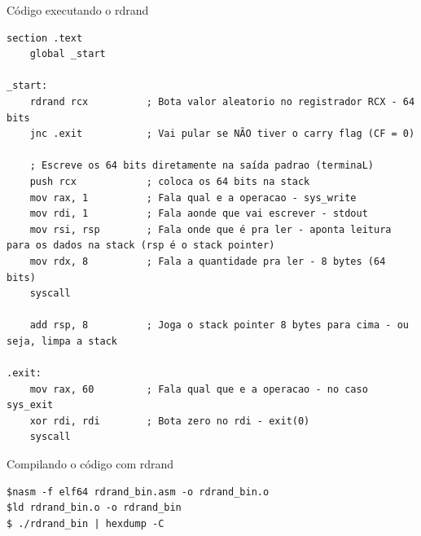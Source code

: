\begin{frame}[fragile]{Código executando o rdrand}
\tiny
    \begin{verbatim}
section .text
    global _start

_start:
    rdrand rcx          ; Bota valor aleatorio no registrador RCX - 64 bits
    jnc .exit           ; Vai pular se NÃO tiver o carry flag (CF = 0)

    ; Escreve os 64 bits diretamente na saída padrao (terminaL)
    push rcx            ; coloca os 64 bits na stack
    mov rax, 1          ; Fala qual e a operacao - sys_write
    mov rdi, 1          ; Fala aonde que vai escrever - stdout
    mov rsi, rsp        ; Fala onde que é pra ler - aponta leitura para os dados na stack (rsp é o stack pointer)
    mov rdx, 8          ; Fala a quantidade pra ler - 8 bytes (64 bits)
    syscall

    add rsp, 8          ; Joga o stack pointer 8 bytes para cima - ou seja, limpa a stack

.exit:
    mov rax, 60         ; Fala qual que e a operacao - no caso sys_exit
    xor rdi, rdi        ; Bota zero no rdi - exit(0)
    syscall
    \end{verbatim}
\end{frame}

\begin{frame}[fragile]{Compilando o código com rdrand}
\begin{verbatim}
$nasm -f elf64 rdrand_bin.asm -o rdrand_bin.o
$ld rdrand_bin.o -o rdrand_bin
$ ./rdrand_bin | hexdump -C

\end{verbatim}
    
\end{frame}